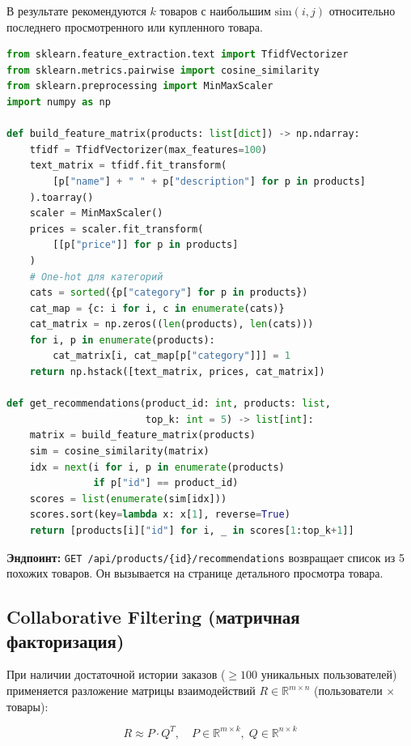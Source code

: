\documentclass[14pt,a4paper]{extreport}
\begin{document}
В результате рекомендуются $k$ товаров с наибольшим $\text{sim}(i, j)$ относительно последнего просмотренного или купленного товара.

\begin{lstlisting}[language=Python, caption={Content-Based рекомендации (концептуальный код)}]
from sklearn.feature_extraction.text import TfidfVectorizer
from sklearn.metrics.pairwise import cosine_similarity
from sklearn.preprocessing import MinMaxScaler
import numpy as np

def build_feature_matrix(products: list[dict]) -> np.ndarray:
    tfidf = TfidfVectorizer(max_features=100)
    text_matrix = tfidf.fit_transform(
        [p["name"] + " " + p["description"] for p in products]
    ).toarray()
    scaler = MinMaxScaler()
    prices = scaler.fit_transform(
        [[p["price"]] for p in products]
    )
    # One-hot для категорий
    cats = sorted({p["category"] for p in products})
    cat_map = {c: i for i, c in enumerate(cats)}
    cat_matrix = np.zeros((len(products), len(cats)))
    for i, p in enumerate(products):
        cat_matrix[i, cat_map[p["category"]]] = 1
    return np.hstack([text_matrix, prices, cat_matrix])

def get_recommendations(product_id: int, products: list,
                        top_k: int = 5) -> list[int]:
    matrix = build_feature_matrix(products)
    sim = cosine_similarity(matrix)
    idx = next(i for i, p in enumerate(products)
               if p["id"] == product_id)
    scores = list(enumerate(sim[idx]))
    scores.sort(key=lambda x: x[1], reverse=True)
    return [products[i]["id"] for i, _ in scores[1:top_k+1]]
\end{lstlisting}

\textbf{Эндпоинт:} \texttt{GET /api/products/\{id\}/recommendations} возвращает список из 5 похожих товаров. Он вызывается на странице детального просмотра товара.

\subsection{Collaborative Filtering (матричная факторизация)}

При наличии достаточной истории заказов ($\geq 100$ уникальных пользователей) применяется разложение матрицы взаимодействий $R \in \mathbb{R}^{m \times n}$ (пользователи $\times$ товары):

\begin{equation}
  R \approx P \cdot Q^T, \quad P \in \mathbb{R}^{m \times k},\; Q \in \mathbb{R}^{n \times k}
\end{equation}
\end{document}

